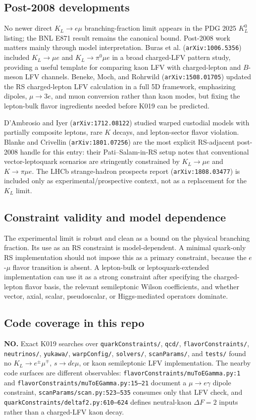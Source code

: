 \subsection*{Post-2008 developments}
No newer direct \(K_L\to e\mu\) branching-fraction limit appears in the
PDG 2025 \(K_L^0\) listing; the BNL E871 result remains the canonical bound.
Post-2008 work matters mainly through model interpretation.  Buras et al.
(\texttt{arXiv:1006.5356}) included \(K_L\to\mu e\) and
\(K_L\to\pi^0\mu e\) in a broad charged-LFV pattern study, providing a useful
template for comparing kaon LFV with charged-lepton and \(B\)-meson LFV
channels.  Beneke, Moch, and Rohrwild (\texttt{arXiv:1508.01705}) updated the
RS charged-lepton LFV calculation in a full 5D framework, emphasizing dipoles,
\(\mu\to 3e\), and muon conversion rather than kaon modes, but fixing the
lepton-bulk flavor ingredients needed before K019 can be predicted.

D'Ambrosio and Iyer (\texttt{arXiv:1712.08122}) studied warped custodial
models with partially composite leptons, rare \(K\) decays, and lepton-sector
flavor violation.  Blanke and Crivellin (\texttt{arXiv:1801.07256}) are the
most explicit RS-adjacent post-2008 handle for this entry: their
Pati--Salam-in-RS setup notes that conventional vector-leptoquark scenarios
are stringently constrained by \(K_L\to\mu e\) and \(K\to\pi\mu e\).  The LHCb
strange-hadron prospects report (\texttt{arXiv:1808.03477}) is included only
as experimental/prospective context, not as a replacement for the \(K_L\)
limit.

\subsection*{Constraint validity and model dependence}
The experimental limit is robust and clean as a bound on the physical
branching fraction.  Its use as an RS constraint is model-dependent.  A
minimal quark-only RS implementation should not impose this as a primary
constraint, because the \(e\)-\(\mu\) flavor transition is absent.  A
lepton-bulk or leptoquark-extended implementation can use it as a strong
constraint after specifying the charged-lepton flavor basis, the relevant
semileptonic Wilson coefficients, and whether vector, axial, scalar,
pseudoscalar, or Higgs-mediated operators dominate.

\subsection*{Code coverage in this repo}
\textbf{NO.}  Exact K019 searches over \texttt{quarkConstraints/},
\texttt{qcd/}, \texttt{flavorConstraints/}, \texttt{neutrinos/},
\texttt{yukawa/}, \texttt{warpConfig/}, \texttt{solvers/},
\texttt{scanParams/}, and \texttt{tests/} found no
\(K_L\to e^{\pm}\mu^{\mp}\), \(s\to d e\mu\), or kaon semileptonic LFV
implementation.  The nearby code surfaces are different observables:
\texttt{flavorConstraints/muToEGamma.py:1} and
\texttt{flavorConstraints/muToEGamma.py:15--21} document a
\(\mu\to e\gamma\) dipole constraint,
\texttt{scanParams/scan.py:523--535} consumes only that LFV check, and
\texttt{quarkConstraints/deltaf2.py:610--624} defines neutral-kaon
\(\Delta F=2\) inputs rather than a charged-LFV kaon decay.

